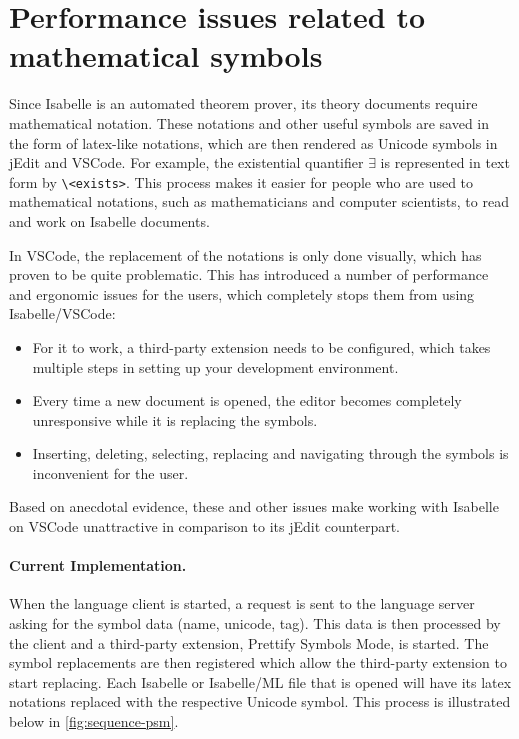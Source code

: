 \section{Performance issues related to mathematical symbols}
\label{section:symbols}

Since Isabelle is an automated theorem prover, its theory documents require mathematical notation. These notations and other useful symbols are saved in the form of latex-like notations, which are then rendered as Unicode symbols in jEdit and VSCode. For example, the existential quantifier $\exists$ is represented in text form by \texttt{\textbackslash<exists>}. This process makes it easier for people who are used to mathematical notations, such as mathematicians and computer scientists, to read and work on Isabelle documents.

In VSCode, the replacement of the notations is only done visually, which has proven to be quite problematic. This has introduced a number of performance and ergonomic issues for the users, which completely stops them from using Isabelle/VSCode: 
\begin{itemize}
  \item For it to work, a third-party extension needs to be configured, which takes multiple steps in setting up your development environment. 
  \item Every time a new document is opened, the editor becomes completely unresponsive while it is replacing the symbols.
  \item Inserting, deleting, selecting, replacing and navigating through the symbols is inconvenient for the user.
\end{itemize}

Based on anecdotal evidence, these and other issues make working with Isabelle on VSCode unattractive in comparison to its jEdit counterpart.

\paragraph{Current Implementation.}
When the language client is started, a request is sent to the language server asking for the symbol data (name, unicode, tag). This data is then processed by the client and a third-party extension, Prettify Symbols Mode, is started. The symbol  replacements are then registered which allow the third-party extension to start replacing. Each Isabelle or Isabelle/ML file that is opened will have its latex notations replaced with the respective Unicode symbol. This process is illustrated below in \autoref{fig:sequence-psm}.

